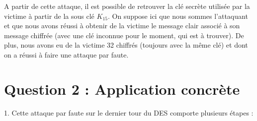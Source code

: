 \documentclass[11pt]{article}
\begin{document}
A partir de cette attaque, il est possible de retrouver la clé secrète utilisée par la victime à partir de la sous clé $K_{15}$. On suppose ici que nous sommes l'attaquant et que nous avons réussi à obtenir de la victime le message clair associé à son message chiffrée (avec une clé inconnue pour le moment, qui est à trouver). De plus, nous avons eu de la victime 32 chiffrés (toujours avec la même clé) et dont on a réussi à faire une attaque par faute. 

\section{Question 2 : Application concrète}

1. Cette attaque par faute sur le dernier tour du DES comporte plusieurs étapes : 
\end{document}
